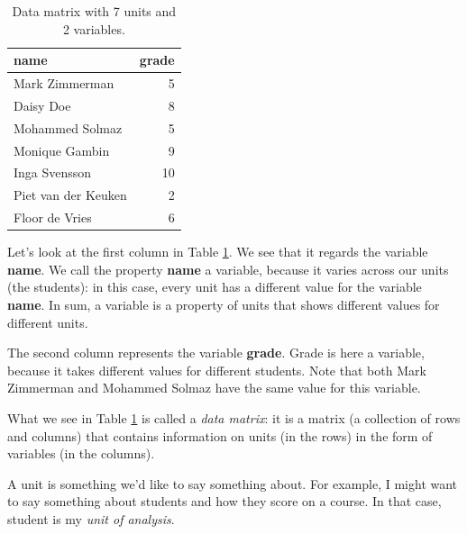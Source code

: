 \documentclass[]{report}\usepackage[]{graphicx}\usepackage[]{color}
\begin{document}
\begin{table}[ht]
\centering
\caption{Data matrix with 7 units and 2 variables.} 
\label{tab:data_1}
\begin{tabular}{lr}
  \hline
name & grade \\ 
  \hline
Mark Zimmerman & 5 \\ 
  Daisy Doe & 8 \\ 
  Mohammed Solmaz & 5 \\ 
  Monique Gambin & 9 \\ 
  Inga Svensson & 10 \\ 
  Piet van der Keuken & 2 \\ 
  Floor de Vries & 6 \\ 
   \hline
\end{tabular}
\end{table}


Let's look at the first column in Table \ref{tab:data_1}. We see that it regards the variable \textbf{name}. We call the property \textbf{name} a variable, because it varies across our units (the students): in this case, every unit has a different value for the variable \textbf{name}. In sum, a variable is a property of units that shows different values for different units.

The second column represents the variable \textbf{grade}. Grade is here a variable, because it takes different values for different students. Note that both Mark Zimmerman and Mohammed Solmaz have the same value for this variable.

What we see in Table \ref{tab:data_1} is called a \textit{data matrix}: it is a matrix (a collection of rows and columns) that contains information on units (in the rows) in the form of variables (in the columns).

A unit is something we'd like to say something about. For example, I might want to say something about students and how they score on a course. In that case, student is my \textit{unit of analysis}.

%
\end{document}
